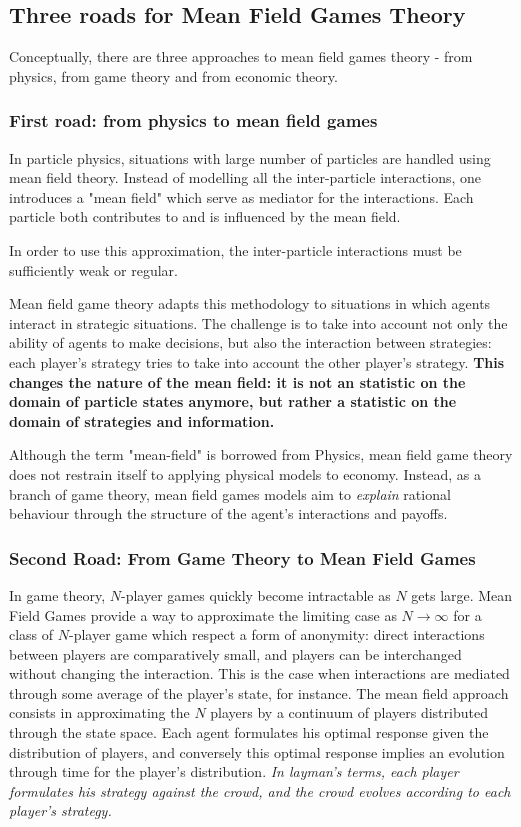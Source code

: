 \documentclass{article}
\begin{document}
\subsection{Three roads for Mean Field Games Theory}

Conceptually, there are three approaches to mean field games theory - from physics, from game theory and from economic theory.

\subsubsection{First road: from physics to mean field games}
In particle physics, situations with large number of particles are handled using mean field theory. Instead of modelling all the inter-particle interactions, one introduces a "mean field" which serve as mediator for the interactions. Each particle both contributes to and is influenced by the mean field.

In order to use this approximation, the inter-particle interactions must be sufficiently weak or regular.

Mean field game theory adapts this methodology to situations in which agents interact in strategic situations. The challenge is to take into account not only the ability of agents to make decisions, but also the interaction between strategies: each player's strategy tries to take into account the other player's strategy.
\textbf{This changes the nature of the mean field: it is not an statistic on the domain of particle states anymore, but rather a statistic on the domain of strategies and information.}

Although the term "mean-field" is borrowed from Physics, mean field game theory does not restrain itself to applying physical models to economy. Instead, as a branch of game theory, mean field games models aim to \textit{explain} rational behaviour through the structure of the agent's interactions and payoffs. \cite{cousin2010paris}

\subsubsection{Second Road: From Game Theory to Mean Field Games}

In game theory, $N$-player games quickly become intractable as $N$ gets large. Mean Field Games provide a way to approximate the limiting case as $N \to \infty$ for a class of $N$-player game which respect a form of anonymity: direct interactions between players are comparatively small, and players can be interchanged without changing the interaction. This is the case when interactions are mediated through some average of the player's state, for instance.
The mean field approach consists in approximating the $N$ players by a continuum of players distributed through the state space. Each agent formulates his optimal response given the distribution of players, and conversely this optimal response implies an evolution through time for the player's distribution.
\textit{In layman's terms, each player formulates his strategy against the crowd, and the crowd evolves according to each player's strategy.}
\end{document}
